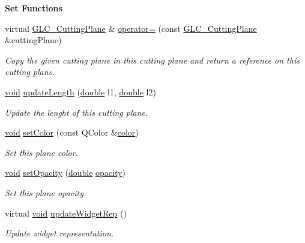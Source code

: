 \begin{Indent}{\bf Set Functions}\par
\begin{DoxyCompactItemize}
\item 
virtual \hyperlink{class_g_l_c___cutting_plane}{G\-L\-C\-\_\-\-Cutting\-Plane} \& \hyperlink{class_g_l_c___cutting_plane_ab97a89bca423f610d2cae4e8faaa7e97}{operator=} (const \hyperlink{class_g_l_c___cutting_plane}{G\-L\-C\-\_\-\-Cutting\-Plane} \&cutting\-Plane)
\begin{DoxyCompactList}\small\item\em Copy the given cutting plane in this cutting plane and return a reference on this cutting plane. \end{DoxyCompactList}\item 
\hyperlink{group___u_a_v_objects_plugin_ga444cf2ff3f0ecbe028adce838d373f5c}{void} \hyperlink{class_g_l_c___cutting_plane_a7c78b660583f6032fa966a7dd36a7fc5}{update\-Length} (\hyperlink{_super_l_u_support_8h_a8956b2b9f49bf918deed98379d159ca7}{double} l1, \hyperlink{_super_l_u_support_8h_a8956b2b9f49bf918deed98379d159ca7}{double} l2)
\begin{DoxyCompactList}\small\item\em Update the lenght of this cutting plane. \end{DoxyCompactList}\item 
\hyperlink{group___u_a_v_objects_plugin_ga444cf2ff3f0ecbe028adce838d373f5c}{void} \hyperlink{class_g_l_c___cutting_plane_a48e42ef0f50f4ebf945d97c8814a4ece}{set\-Color} (const Q\-Color \&\hyperlink{glext_8h_a3ea846f998d64f079b86052b6c4193a8}{color})
\begin{DoxyCompactList}\small\item\em Set this plane color. \end{DoxyCompactList}\item 
\hyperlink{group___u_a_v_objects_plugin_ga444cf2ff3f0ecbe028adce838d373f5c}{void} \hyperlink{class_g_l_c___cutting_plane_aeb6983e11e55efb96e5fc579eec3642c}{set\-Opacity} (\hyperlink{_super_l_u_support_8h_a8956b2b9f49bf918deed98379d159ca7}{double} \hyperlink{class_g_l_c___cutting_plane_a23c0d810579c076c5e2f86c64bb6051f}{opacity})
\begin{DoxyCompactList}\small\item\em Set this plane opacity. \end{DoxyCompactList}\item 
virtual \hyperlink{group___u_a_v_objects_plugin_ga444cf2ff3f0ecbe028adce838d373f5c}{void} \hyperlink{class_g_l_c___cutting_plane_accb19c1a82131397480b98c6b52dcb55}{update\-Widget\-Rep} ()
\begin{DoxyCompactList}\small\item\em Update widget representation. \end{DoxyCompactList}\end{DoxyCompactItemize}
\end{Indent}
